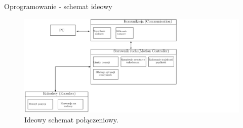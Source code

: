 \documentclass{beamer}
\begin{document}
\begin{frame}{Oprogramowanie - schemat ideowy}
	
\begin{figure}[h]
	\centering
	\includegraphics[height=0.6\textheight]{img/core_agent_firmware_schematics-1.png}
	\caption{Ideowy schemat połączeniowy.}
	\label{ros:schemat-elektronika}
\end{figure}
\end{frame}
\end{document}
